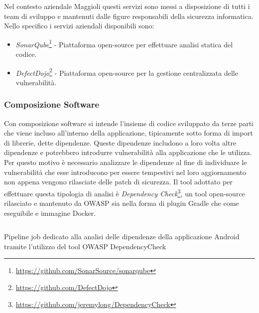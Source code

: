 Nel contesto aziendale Maggioli questi servizi sono messi a disposizione di tutti i team di sviluppo e mantenuti dalle figure responsabili della sicurezza informatica. Nello specifico i servizi aziendali disponibili sono:
\begin{itemize}
    \item \textit{SonarQube}\footnote{\url{https://github.com/SonarSource/sonarqube}} - Piattaforma open-source per effettuare analisi statica del codice.
    \item \textit{DefectDojo}\footnote{\url{https://github.com/DefectDojo}} - Piattaforma open-source per la gestione centralizzata delle vulnerabilità.
\end{itemize}

\subsubsection{Composizione Software}
Con composizione software si intende l'insieme di codice sviluppato da terze parti che viene incluso all'interno della applicazione, tipicamente sotto forma di import di librerie, dette dipendenze. Queste dipendenze includono a loro volta altre dipendenze e potrebbero introdurre vulnerabilità alla applicazione che le utilizza. \\
Per questo motivo è necessario analizzare le dipendenze al fine di individuare le vulnerabilità che esse introducono per essere tempestivi nel loro aggiornamento non appena vengono rilasciate delle patch di sicurezza. Il tool adottato per effettuare questa tipologia di analisi è \textit{Dependency Check}\footnote{\url{https://github.com/jeremylong/DependencyCheck}}, un tool open-source rilasciato e mantenuto da OWASP sia nella forma di plugin Gradle che come eseguibile e immagine Docker.

\begin{listing}[H]
\inputminted{yaml}{code/4-depcheckjob}
\caption{Pipeline job dedicato alla analisi delle dipendenze della applicazione Android tramite l'utilizzo del tool OWASP DependencyCheck}
\end{listing}

